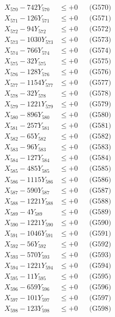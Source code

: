 \documentclass[a4paper,10pt]{article}
\begin{document}
{\begin{align}
X_{570} - 742Y_{570} &\leq +0 && \text{(G570)} \\
\allowbreak
X_{571} - 126Y_{571} &\leq +0 && \text{(G571)} \\
X_{572} - 94Y_{572} &\leq +0 && \text{(G572)} \\
X_{573} - 1030Y_{573} &\leq +0 && \text{(G573)} \\
X_{574} - 766Y_{574} &\leq +0 && \text{(G574)} \\
X_{575} - 32Y_{575} &\leq +0 && \text{(G575)} \\
X_{576} - 128Y_{576} &\leq +0 && \text{(G576)} \\
X_{577} - 1154Y_{577} &\leq +0 && \text{(G577)} \\
X_{578} - 32Y_{578} &\leq +0 && \text{(G578)} \\
X_{579} - 1221Y_{579} &\leq +0 && \text{(G579)} \\
X_{580} - 896Y_{580} &\leq +0 && \text{(G580)} \\
\allowbreak
X_{581} - 257Y_{581} &\leq +0 && \text{(G581)} \\
X_{582} - 65Y_{582} &\leq +0 && \text{(G582)} \\
X_{583} - 96Y_{583} &\leq +0 && \text{(G583)} \\
X_{584} - 127Y_{584} &\leq +0 && \text{(G584)} \\
X_{585} - 485Y_{585} &\leq +0 && \text{(G585)} \\
X_{586} - 1115Y_{586} &\leq +0 && \text{(G586)} \\
X_{587} - 590Y_{587} &\leq +0 && \text{(G587)} \\
X_{588} - 1221Y_{588} &\leq +0 && \text{(G588)} \\
X_{589} - 4Y_{589} &\leq +0 && \text{(G589)} \\
X_{590} - 1221Y_{590} &\leq +0 && \text{(G590)} \\
\allowbreak
X_{591} - 1046Y_{591} &\leq +0 && \text{(G591)} \\
X_{592} - 56Y_{592} &\leq +0 && \text{(G592)} \\
X_{593} - 570Y_{593} &\leq +0 && \text{(G593)} \\
X_{594} - 1221Y_{594} &\leq +0 && \text{(G594)} \\
X_{595} - 11Y_{595} &\leq +0 && \text{(G595)} \\
X_{596} - 659Y_{596} &\leq +0 && \text{(G596)} \\
X_{597} - 101Y_{597} &\leq +0 && \text{(G597)} \\
X_{598} - 123Y_{598} &\leq +0 && \text{(G598)} \\

\end{align}}
\end{document}
